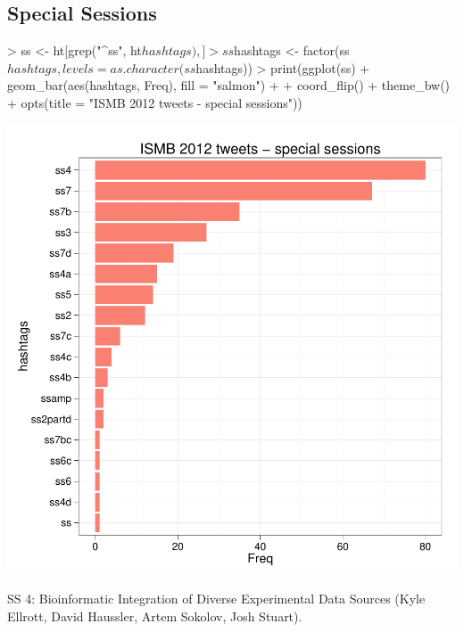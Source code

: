 \documentclass[a4paper,10pt]{article}
\begin{document}
\subsection{Special Sessions}
\begin{center}
\begin{Schunk}
\begin{Sinput}
> ss <- ht[grep("^ss", ht$hashtags),]
> ss$hashtags <- factor(ss$hashtags, levels = as.character(ss$hashtags))
> print(ggplot(ss) + geom_bar(aes(hashtags, Freq), fill = "salmon") + 
+   coord_flip() + theme_bw() + opts(title = "ISMB 2012 tweets - special sessions"))
\end{Sinput}
\end{Schunk}
\includegraphics{ismb-007}
\end{center}

SS 4: Bioinformatic Integration of Diverse Experimental Data Sources (Kyle Ellrott,  David Haussler, Artem Sokolov, Josh Stuart).

\newpage
\end{document}
